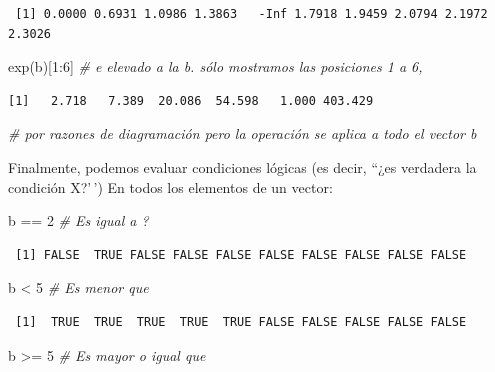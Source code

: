 \documentclass[
  12pt,
  spanish,
]{book}
\newenvironment{Shaded}{\begin{snugshade}}{\end{snugshade}}
\newcommand{\CommentTok}[1]{\textcolor[rgb]{0.56,0.35,0.01}{\textit{#1}}}
\newcommand{\DecValTok}[1]{\textcolor[rgb]{0.00,0.00,0.81}{#1}}
\newcommand{\FunctionTok}[1]{\textcolor[rgb]{0.00,0.00,0.00}{#1}}
\newcommand{\NormalTok}[1]{#1}
\newcommand{\SpecialCharTok}[1]{\textcolor[rgb]{0.00,0.00,0.00}{#1}}
\begin{document}
\begin{verbatim}
 [1] 0.0000 0.6931 1.0986 1.3863   -Inf 1.7918 1.9459 2.0794 2.1972 2.3026
\end{verbatim}

\begin{Shaded}
\begin{Highlighting}[]
\FunctionTok{exp}\NormalTok{(b)[}\DecValTok{1}\SpecialCharTok{:}\DecValTok{6}\NormalTok{] }\CommentTok{\# e elevado a la b. sólo mostramos las posiciones 1 a 6,}
\end{Highlighting}
\end{Shaded}

\begin{verbatim}
[1]   2.718   7.389  20.086  54.598   1.000 403.429
\end{verbatim}

\begin{Shaded}
\begin{Highlighting}[]
\CommentTok{\# por razones de diagramación pero la operación se  aplica a todo el vector b}
\end{Highlighting}
\end{Shaded}

Finalmente, podemos evaluar condiciones lógicas (es decir, ``¿es verdadera la condición X?'\,') En todos los elementos de un vector:

\begin{Shaded}
\begin{Highlighting}[]
\NormalTok{b }\SpecialCharTok{==} \DecValTok{2} \CommentTok{\# Es igual a ?}
\end{Highlighting}
\end{Shaded}

\begin{verbatim}
 [1] FALSE  TRUE FALSE FALSE FALSE FALSE FALSE FALSE FALSE FALSE
\end{verbatim}

\begin{Shaded}
\begin{Highlighting}[]
\NormalTok{b }\SpecialCharTok{\textless{}} \DecValTok{5} \CommentTok{\# Es menor que}
\end{Highlighting}
\end{Shaded}

\begin{verbatim}
 [1]  TRUE  TRUE  TRUE  TRUE  TRUE FALSE FALSE FALSE FALSE FALSE
\end{verbatim}

\begin{Shaded}
\begin{Highlighting}[]
\NormalTok{b }\SpecialCharTok{\textgreater{}=} \DecValTok{5} \CommentTok{\# Es mayor o igual que}
\end{Highlighting}
\end{Shaded}
\end{document}
